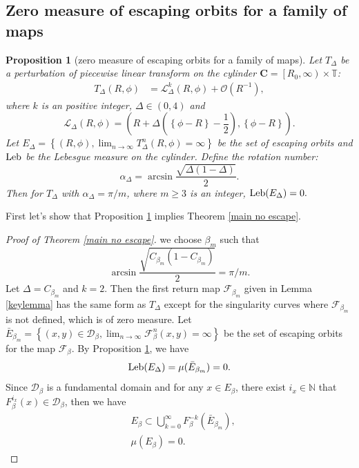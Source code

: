 \documentclass{article}
\numberwithin{figure}{section}
\numberwithin{equation}{section}
\newtheorem{main}{Proposition}
\theoremstyle{remark}
\theoremstyle{definition}
\begin{document}
\subsection{Zero measure of escaping orbits for a family of maps}
{\color{red}
\begin{main}[zero measure of escaping orbits for a family of maps]\label{key proposition}
Let $T_\Delta$ be a perturbation of piecewise linear transform on the cylinder  $\textbf{C} = \left[R_0, \infty\right) \times \mathbb{T}$:
\begin{align*}
    T_\Delta(R,\phi)&=\mathcal{L}_\Delta^k(R,\phi)+\mathcal{O}(R^{-1}),
\end{align*}
where $k$ is an positive integer, $\Delta\in(0,4)$ and
\begin{equation}
		\mathcal{L}_\Delta\left(R,\phi\right)=\left(R+\Delta\left(\left\{\phi-R\right\}-\frac{1}{2}\right), \left\{\phi-R\right\}\right).
\end{equation}
Let $E_\Delta=\left\{(R,\phi),\lim_{n\rightarrow\infty}T_\Delta^n(R,\phi)=\infty\right\}$ be the set of escaping orbits and ${\rm 
Leb}$ be the Lebesgue measure on the cylinder. Define the rotation number:
\begin{equation}
    \alpha_\Delta=\arcsin{\frac{\sqrt{\Delta(1-\Delta)}}{2}}.
\end{equation}
Then for $T_\Delta$ with $\alpha_\Delta=\pi/m$, where $m\geq 3$ is an integer,
${\rm Leb}(E_\Delta)=0.$
\end{main}
}
First let's show that Proposition \ref{key proposition} implies Theorem \ref{main no escape}.
\begin{proof}[Proof of Theorem \ref{main no escape}]
    we choose $\beta_m$ such that 
    $$\arcsin{\frac{\sqrt{C_{\beta_m}(1-C_{\beta_m})}}{2}}=\pi/m.$$ Let $\Delta=C_{\beta_m}$ and $k=2$. Then the first return map $\mathcal{F}_{\beta_m}$ given in Lemma \ref{keylemma} has the same form as $T_\Delta$ except for the singularity curves where $\mathcal{F}_{\beta_m}$ is not defined, which is of zero measure.
    Let $\bar{E}_{\beta_m}=\left\{(x,y)\in \mathcal{D}_\beta,\lim_{n\rightarrow\infty}\mathcal{F}_\beta^n(x,y)=\infty\right\}$ be the set of escaping orbits for the map $\mathcal{F}_\beta$.
    By Proposition \ref{key proposition}, we have $${\rm Leb}(E_\Delta)=\mu(\bar{E}_{\beta_m})=0.$$    
    Since $\mathcal{D}_\beta$ is a fundamental domain and for any $x\in E_\beta$, there exist $i_x\in\mathbb{N}$ that $F_\beta^{i_x}(x)\in \mathcal{D}_\beta$, then we have
\begin{align*}
	&E_\beta \subset \bigcup_{k=0}^{\infty}F_\beta^{-k}\left(\bar{E}_{\beta_m}\right),\\
	&\mu\left(E_\beta\right)=0.
\end{align*}
\end{proof}
\end{document}
